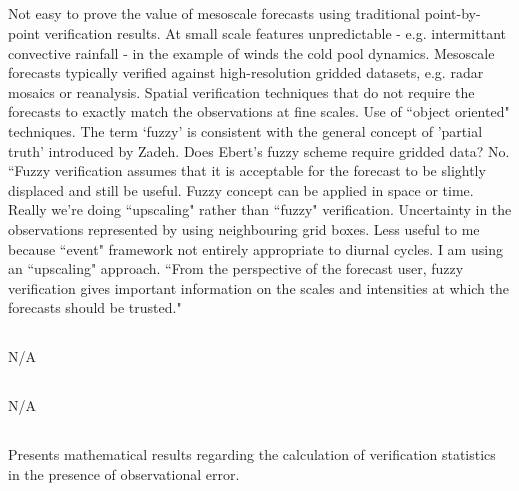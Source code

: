 \documentclass[alpha-refs]{wiley-article}
\begin{document}
\subsection{\citet{ebert08}}
Not easy to prove the value of mesoscale forecasts using traditional point-by-point verification results. At small scale features unpredictable - e.g. intermittant convective rainfall - in the example of winds the cold pool dynamics. Mesoscale forecasts typically verified against high-resolution gridded datasets, e.g. radar mosaics or reanalysis. Spatial verification techniques that do not require the forecasts to exactly match the observations at fine scales. Use of ``object oriented" techniques. The term `fuzzy' is consistent with the general concept of 'partial truth' introduced by Zadeh. Does Ebert's fuzzy scheme require gridded data? No. ``Fuzzy verification assumes that it is acceptable for the forecast to be slightly displaced and still be useful. Fuzzy concept can be applied in space or time. Really we're doing ``upscaling" rather than ``fuzzy" verification. Uncertainty in the observations represented by using neighbouring grid boxes. Less useful to me because ``event" framework not entirely appropriate to diurnal cycles. I am using an ``upscaling" approach. ``From the perspective of the forecast user, fuzzy verification gives important information on the scales and intensities at which the forecasts should be trusted."

\subsection{\citet{ebert00}}
N/A

\subsection{\citet{yates06}}
N/A

\subsection{\citet{mason08}}


\subsection{\citet{ferro17}}
Presents mathematical results regarding the calculation of verification statistics in the presence of observational error. 
\end{document}

